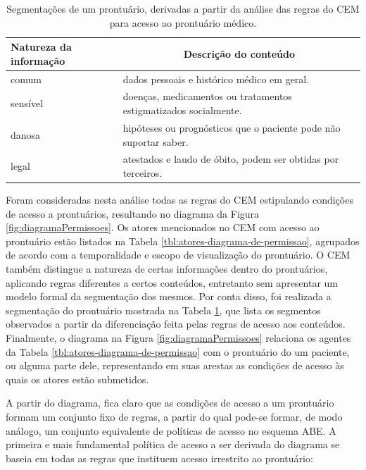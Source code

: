 \documentclass[a4paper,11pt]{article}
\newcommand*{\centerhead}[1]{\multicolumn{1}{|c|}{#1}}
\begin{document}
\begin{table}[h]
  \begin{center}
    \begin{tabular}{ |p{5cm}|p{7cm}| }
      \hline
      \textbf{Natureza da informação} & \centerhead{\textbf{Descrição do conteúdo}} \\
      \hline
      comum & dados pessoais e histórico médico em geral. \\
      \hline
      sensível & doenças, medicamentos ou tratamentos estigmatizados socialmente. \\
      \hline
      danosa  & hipóteses ou prognósticos que o paciente pode não suportar saber. \\
      \hline
      legal & atestados e laudo de óbito, podem ser obtidas por terceiros. \\
      \hline
    \end{tabular}
  \caption{Segmentações de um prontuário, derivadas a partir da análise das regras do CEM para acesso ao prontuário médico.}
  \label{tbl:segmentacoes-prontuario}
\end{center}
\end{table}

Foram consideradas nesta análise todas as regras do CEM estipulando condições de acesso a prontuários, resultando no diagrama da Figura \ref{fig:diagramaPermissoes}.
Os atores mencionados no CEM com acesso ao prontuário estão listados na Tabela \ref{tbl:atores-diagrama-de-permissao}, agrupados de acordo com a temporalidade e escopo de visualização do prontuário.
O CEM também distingue a natureza de certas informações dentro do prontuários, aplicando regras diferentes a certos conteúdos, entretanto sem apresentar um modelo formal da segmentação dos mesmos. %
Por conta disso, foi realizada a segmentação do prontuário mostrada na Tabela \ref{tbl:segmentacoes-prontuario}, que lista os segmentos observados a partir da diferenciação feita pelas regras de acesso aos conteúdos. %
Finalmente, o diagrama na Figura \ref{fig:diagramaPermissoes} relaciona os agentes da Tabela \ref{tbl:atores-diagrama-de-permissao} com o prontuário do um paciente, ou alguma parte dele, representando em suas arestas as condições de acesso às quais os atores estão submetidos.

A partir do diagrama, fica claro que as condições de acesso a um prontuário formam um conjunto fixo de regras, a partir do qual pode-se formar, de modo análogo, um conjunto equivalente de políticas de acesso no esquema ABE.
A primeira e mais fundamental política de acesso a ser derivada do diagrama se baseia em todas as regras que instituem acesso irrestrito ao prontuário:
\end{document}
